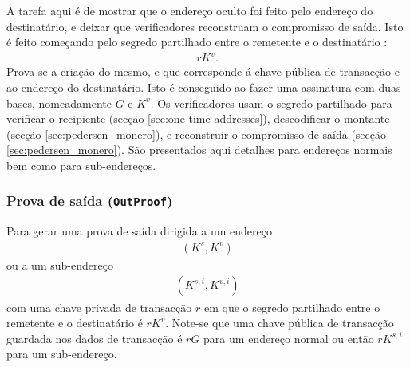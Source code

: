 A tarefa aqui é de mostrar que o endereço oculto foi feito pelo endereço do destinatário, e deixar que verificadores reconstruam o compromisso de saída. Isto é feito começando pelo segredo partilhado entre o remetente e o destinatário : 
\begin{align*}
rK^v .
\end{align*}
Prova-se a criação do mesmo, e que corresponde á chave pública de transacção e ao endereço do destinatário. Isto é conseguido ao fazer uma assinatura com duas bases, nomeadamente $G$ e $K^v$. Os verificadores usam o segredo partilhado para verificar o recipiente  (secção \ref{sec:one-time-addresses}), descodificar o montante (secção \ref{sec:pedersen_monero}), e reconstruir o compromisso de saída (secção \ref{sec:pedersen_monero}). São presentados aqui detalhes para endereços normais bem como para sub-endereços.   

\subsubsection*{Prova de saída ({\tt OutProof}) }

Para gerar uma prova de saída dirigida a um endereço 
\begin{align*}
(K^{s}, K^{v})
\end{align*}
ou a um sub-endereço
\begin{align*}
(K^{s,i}, K^{v,i})
\end{align*}
com uma chave privada de transacção $r$ em que o segredo partilhado entre o remetente e o destinatário é $rK^v$. Note-se que uma chave pública de transacção guardada nos dados de transacção é $rG$ para um endereço normal ou então $rK^{s,i}$ para um sub-endereço.

